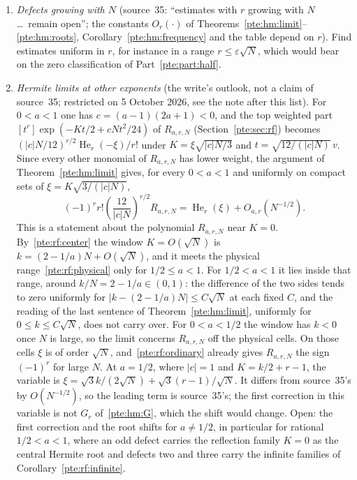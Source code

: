\documentclass[11pt,a4paper]{article}
\numberwithin{equation}{section}
\theoremstyle{definition}
\theoremstyle{plain}
\newcommand{\He}{\operatorname{He}}
\begin{document}
\begin{enumerate}
\item\label{pte:hm:q:growing} \emph{Defects growing with $N$} (source~35: ``estimates with $r$ growing with $N$ \ldots\ remain open''; the constants $O_r(\cdot)$ of Theorems~\ref{pte:hm:limit}--\ref{pte:hm:roots}, Corollary~\ref{pte:hm:frequency} and the table depend on $r$). Find estimates uniform in $r$, for instance in a range $r\le\varepsilon\sqrt N$, which would bear on the zero classification of Part~\ref{pte:part:half}.
\item\label{pte:hm:q:other} \emph{Hermite limits at other exponents} (the write's outlook, not a claim of source~35; restricted on 5 October 2026, see the note after this list). For $0<a<1$ one has $c=(a-1)(2a+1)<0$, and the top weighted part $[t^r]\exp(-Kt/2+cNt^2/24)$ of $R_{a,r,N}$ (Section~\ref{pte:sec:rf}) becomes $(|c|N/12)^{r/2}\He_r(-\xi)/r!$ under $K=\xi\sqrt{|c|N/3}$ and $t=\sqrt{12/(|c|N)}\,v$. Since every other monomial of $R_{a,r,N}$ has lower weight, the argument of Theorem~\ref{pte:hm:limit} gives, for every $0<a<1$ and uniformly on compact sets of $\xi=K\sqrt{3/(|c|N)}$,
\[
 (-1)^r r!\left(\frac{12}{|c|N}\right)^{r/2}R_{a,r,N}=\He_r(\xi)+O_{a,r}(N^{-1/2}).
\]
This is a statement about the polynomial $R_{a,r,N}$ near $K=0$. By~\eqref{pte:rf:center} the window $K=O(\sqrt N)$ is $k=(2-1/a)N+O(\sqrt N)$, and it meets the physical range~\eqref{pte:rf:physical} only for $1/2\le a<1$. For $1/2<a<1$ it lies inside that range, around $k/N=2-1/a\in(0,1)$: the difference of the two sides tends to zero uniformly for $|k-(2-1/a)N|\le C\sqrt N$ at each fixed $C$, and the reading of the last sentence of Theorem~\ref{pte:hm:limit}, uniformly for $0\le k\le C\sqrt N$, does not carry over. For $0<a<1/2$ the window has $k<0$ once $N$ is large, so the limit concerns $R_{a,r,N}$ off the physical cells. On those cells $\xi$ is of order $\sqrt N$, and~\eqref{pte:rf:ordinary} already gives $R_{a,r,N}$ the sign $(-1)^r$ for large $N$. At $a=1/2$, where $|c|=1$ and $K=k/2+r-1$, the variable is $\xi=\sqrt3k/(2\sqrt N)+\sqrt3(r-1)/\sqrt N$. It differs from source~35's by $O(N^{-1/2})$, so the leading term is source~35's; the first correction in this variable is not $G_r$ of~\eqref{pte:hm:G}, which the shift would change. Open: the first correction and the root shifts for $a\ne1/2$, in particular for rational $1/2<a<1$, where an odd defect carries the reflection family $K=0$ as the central Hermite root and defects two and three carry the infinite families of Corollary~\ref{pte:rf:infinite}.
\end{enumerate}
\end{document}
